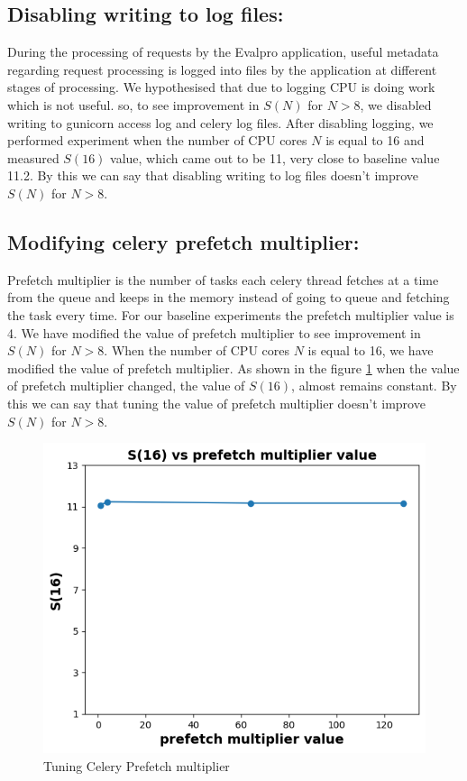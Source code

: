 \documentclass[sigconf]{acmart}
\begin{document}
\subsection{Disabling writing to log files:}
During the processing of requests by the Evalpro application, useful metadata regarding request processing is logged into files by the application at different stages of processing. We hypothesised that due to logging CPU is doing work which is not useful. so, to see improvement in $S(N)$ for $N>8$, we disabled writing to gunicorn access log and celery log files. After disabling logging, we performed experiment when the number of CPU cores $N$ is equal to 16 and measured $S(16)$ value, which came out to be 11, very close to baseline value 11.2. By this we can say that disabling writing to log files  doesn't improve $S(N)$ for $N>8$.
\subsection{Modifying celery prefetch multiplier:}
Prefetch multiplier is the number of tasks each celery thread fetches at a time from the queue and keeps in the memory instead of going to queue and fetching the task every time. For our baseline experiments the prefetch multiplier value is 4.  We have modified the value of prefetch multiplier  to see improvement in $S(N)$ for $N>8$. When the number of CPU cores $N$ is equal to 16,  we have modified the value of prefetch multiplier.  As shown in the figure \ref{prefetch_multiplier_plot} when the value of  prefetch multiplier changed, the value of $S(16)$,  almost remains constant. By this we can say that tuning the value of prefetch multiplier doesn't improve  $S(N)$ for $N>8$.
\begin{figure}[!htb]
  \centering
  \includegraphics[width=\linewidth]{Pictures/prefetch_multiplier.png}
  \caption{Tuning Celery Prefetch multiplier}
  \label{prefetch_multiplier_plot}
\end{figure}
\end{document}
